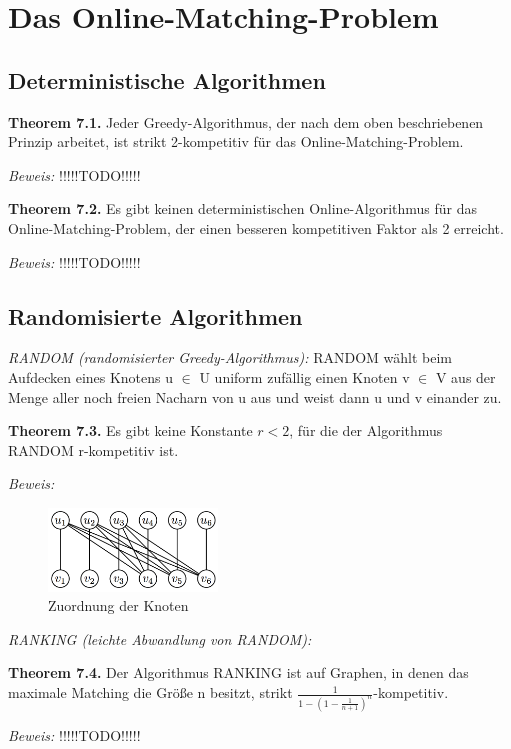 {\chapter{Das Online-Matching-Problem}

\section{Deterministische Algorithmen}

\textbf{Theorem 7.1.} Jeder Greedy-Algorithmus, der nach dem oben beschriebenen Prinzip arbeitet, ist strikt 2-kompetitiv für das Online-Matching-Problem.

\textit{Beweis:} !!!!!TODO!!!!!

\textbf{Theorem 7.2.} Es gibt keinen deterministischen Online-Algorithmus für das Online-Matching-Problem, der einen besseren kompetitiven Faktor als 2 erreicht.

\textit{Beweis:} !!!!!TODO!!!!!

\section{Randomisierte Algorithmen}

\textit{RANDOM (randomisierter Greedy-Algorithmus):} RANDOM wählt beim Aufdecken eines Knotens u $\in$ U uniform zufällig einen Knoten v $\in$ V aus der Menge aller noch freien Nacharn von u aus und weist dann u und v einander zu.

\textbf{Theorem 7.3.} Es gibt keine Konstante $r < 2$, für die der Algorithmus RANDOM r-kompetitiv ist.

\textit{Beweis:}

\begin{figure}[h]
  \centering
  \includegraphics[width=0.4\textwidth]{7_3}
  \caption{Zuordnung der Knoten}
\end{figure}

\textit{RANKING (leichte Abwandlung von RANDOM):}

\textbf{Theorem 7.4.} Der Algorithmus RANKING ist auf Graphen, in denen das maximale Matching die Größe n besitzt, strikt $\tfrac{1}{1-(1-\tfrac{1}{n+1})^{n}}$-kompetitiv.

\textit{Beweis:} !!!!!TODO!!!!!

}
